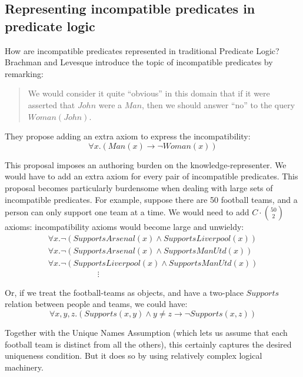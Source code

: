 \subsection{Representing incompatible predicates in predicate logic}\label{incompatiblepredicatesinfol}


\NI How are incompatible predicates represented in traditional
Predicate Logic?  Brachman and Levesque\cite{brachman} introduce the
topic of incompatible predicates by remarking:
\begin{quote}
   We would consider it quite ``obvious'' in this domain that if it
   were asserted that $John$ were a $Man$, then we should answer
   ``no'' to the query $Woman(John)$.
\end{quote}

\NI They propose adding an extra axiom to express the incompatibility:
\[
   \forall x. ( Man(x) \rightarrow \neg Woman(x) )
\]  
 
\NI This proposal imposes an authoring burden on the
knowledge-representer.  We would have to add an extra axiom for every
pair of incompatible predicates.  This proposal becomes particularly
burdensome when dealing with large sets of incompatible predicates.
For example, suppose there are 50 football teams, and a person can
only support one team at a time.  We would need to add $C \cdot {50 \choose 2}$
axioms: incompatibility axioms would become large and unwieldy:
\[
\begin{array}{l}
  \forall x.  \neg (SupportsArsenal(x) \land SupportsLiverpool(x))  \\
  \forall x.  \neg (SupportsArsenal(x) \land SupportsManUtd(x))  \\
  \forall x.  \neg (SupportsLiverpool(x) \land SupportsManUtd(x))  \\
  \qquad \qquad \qquad \vdots
\end{array}
\]

\NI Or, if we treat the football-teams as objects, and have a
two-place $Supports$ relation between people and teams, we could have:
\[
   \forall x, y, z. (Supports(x,y) \land y \neq z \rightarrow \neg Supports(x,z))
\]   

\NI Together with the Unique Names Assumption (which lets us assume
that each football team is distinct from all the others), this
certainly captures the desired uniqueness condition.  But it does so
by using relatively complex logical machinery.

